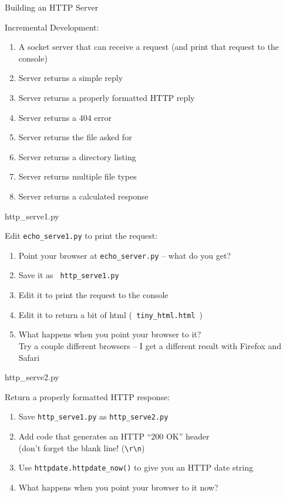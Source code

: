 \documentclass{beamer}
\begin{document}
\begin{frame}{Building an HTTP Server}

{\Large Incremental Development:}
\begin{enumerate}
  \item A socket server that can receive a request (and print that request to the console)
  \item Server returns a simple reply
  \item Server returns a properly formatted HTTP reply
  \item Server returns a 404 error
  \item Server returns the file asked for
  \item Server returns a directory listing
  \item Server returns multiple file types
  \item Server returns a calculated response
\end{enumerate}

\end{frame}

\begin{frame}[fragile]{http\_serve1.py}

{\Large Edit \verb|echo_serve1.py| to print the request:}
\begin{enumerate}
  \item Point your browser at \verb|echo_server.py| -- what do you get?
  \item Save it as \verb| http_serve1.py |
  \item Edit it to print the request to the console
  \item Edit it to return a bit of html (\verb| tiny_html.html |)
  \item What happens when you point your browser to it? \\
        Try a couple different browsers -- I get a different result with Firefox and Safari
\end{enumerate}

\end{frame}

\begin{frame}[fragile]{http\_serve2.py}

{\Large Return a properly formatted HTTP response:}
\begin{enumerate}
  \item Save \verb|http_serve1.py|  as \verb|http_serve2.py|
  \item Add code that generates an HTTP ``200 OK'' header \\
        (don't forget the blank line! (\verb|\r\n|)
  \item Use \verb|httpdate.httpdate_now()| to give you an HTTP date string
  \item What happens when you point your browser to it now?
\end{enumerate}

\end{frame}
\end{document}

